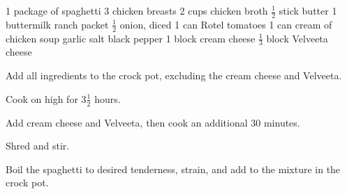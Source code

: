 \dishtype{\main}
\begin{ingreds}
    1 package of spaghetti
    3 chicken breasts
    2 cups chicken broth
    $\frac{1}{2}$ stick butter 
    1 buttermilk ranch packet
    $\frac{1}{2}$ onion, diced
    1 can Rotel tomatoes 
    1 can cream of chicken soup
    garlic salt
    black pepper
    1 block cream cheese
    $\frac{1}{3}$ block Velveeta\textsuperscript{\textregistered} cheese
\end{ingreds}
\begin{method}
    Add all ingredients to the crock pot, excluding the cream cheese and Velveeta\textsuperscript{\textregistered}.\par
    Cook on high for 3$\frac{1}{2}$ hours.\par
    Add cream cheese and Velveeta\textsuperscript{\textregistered}, then cook an additional 30 minutes.\par
    Shred and stir.\par
    Boil the spaghetti to desired tenderness, strain, and add to the mixture in the crock pot. 
\end{method}